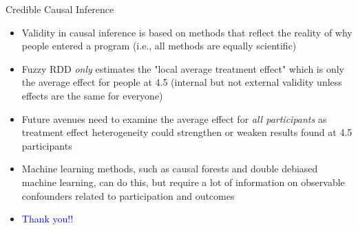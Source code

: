 \documentclass{beamer}
\begin{document}
\begin{frame}{Credible Causal Inference}

\begin{itemize}

\item Validity in causal inference is based on methods that reflect the reality of why people entered a program (i.e., all methods are equally scientific)
\item Fuzzy RDD \emph{only} estimates the "local average treatment effect" which is only the average effect for people at 4.5 (internal but not external validity unless effects are the same for everyone)
\item Future avenues need to examine the average effect for \emph{all participants} as treatment effect heterogeneity could strengthen or weaken results found at 4.5
participants
\item Machine learning methods, such as causal forests and double debiased machine learning, can do this, but require a lot of information on observable confounders related to participation and outcomes
\item \textcolor{blue}{Thank you!!}

\end{itemize}

\end{frame}

\end{document}
